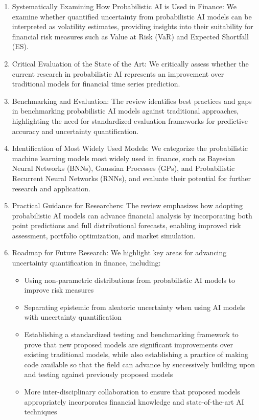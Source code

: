 \begin{enumerate}
    \item Systematically Examining How Probabilistic AI is Used in Finance: We examine whether quantified uncertainty from probabilistic AI models can be interpreted as volatility estimates, providing insights into their suitability for financial risk measures such as Value at Risk (VaR) and Expected Shortfall (ES).
    \item Critical Evaluation of the State of the Art: We critically assess whether the current research in probabilistic AI represents an improvement over traditional models for financial time series prediction.
    \item Benchmarking and Evaluation: The review identifies best practices and gaps in benchmarking probabilistic AI models against traditional approaches, highlighting the need for standardized evaluation frameworks for predictive accuracy and uncertainty quantification.
    \item Identification of Most Widely Used Models: We categorize the probabilistic machine learning models most widely used in finance, such as Bayesian Neural Networks (BNNs), Gaussian Processes (GPs), and Probabilistic Recurrent Neural Networks (RNNs), and evaluate their potential for further research and application.
    \item Practical Guidance for Researchers: The review emphasizes how adopting probabilistic AI models can advance financial analysis by incorporating both point predictions and full distributional forecasts, enabling improved risk assessment, portfolio optimization, and market simulation.
    \item Roadmap for Future Research: We highlight key areas for advancing uncertainty
quantification in finance, including:
        \begin{itemize}[leftmargin=1.5em] %
            \item Using non-parametric distributions from probabilistic AI models to improve risk measures
            \item Separating epistemic from aleatoric uncertainty when using AI models with uncertainty quantification
            \item Establishing a standardized testing and benchmarking framework to prove that new proposed models are significant improvements over existing traditional models, while also establishing a practice of making code available so that the field can advance by successively building upon and testing against previously proposed models
            \item More inter-disciplinary collaboration to ensure that proposed models appropriately incorporates financial knowledge and state-of-the-art AI techniques
        \end{itemize}
\end{enumerate}

